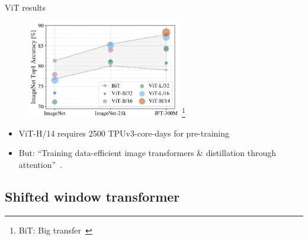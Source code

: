 \documentclass[xcolor=pdftex,dvipsnames,table,mathserif]{beamer}
\begin{document}
\begin{frame}{ViT results}

\begin{figure}[ht]
  \centering
  \includegraphics[width=0.6\textwidth]{vit_graph}
  \footnote{BiT: Big transfer~\cite{kolesnikov_big_2020}}
\end{figure}



\begin{itemize}
  \item ViT-H/14 requires 2500 TPUv3-core-days for pre-training
  \item But: ``Training data-efficient image transformers \& distillation through attention''~\cite{touvron_training_2021}.

\end{itemize}

\end{frame}



\subsection{Shifted window transformer}
\end{document}
